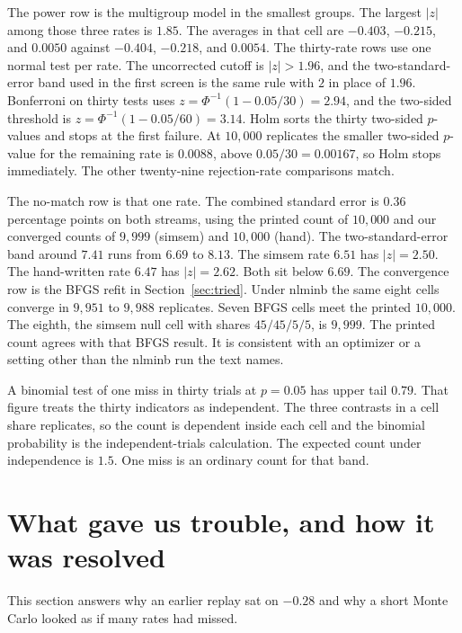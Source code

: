 \documentclass[11pt]{article}
\begin{document}
The power row is the multigroup model in the smallest groups. The
largest \(|z|\) among those three rates is \(1.85\). The averages in
that cell are \(-0.403\), \(-0.215\), and \(0.0050\) against
\(-0.404\), \(-0.218\), and \(0.0054\). The thirty-rate rows use one
normal test per rate. The uncorrected cutoff is \(|z|>1.96\), and the
two-standard-error band used in the first screen is the same rule with
\(2\) in place of \(1.96\). Bonferroni on thirty tests uses
\(z=\Phi^{-1}(1-0.05/30)=2.94\), and the two-sided threshold is
\(z=\Phi^{-1}(1-0.05/60)=3.14\). Holm sorts the thirty two-sided
\(p\)-values and stops at the first failure. At \(10{,}000\) replicates the smaller two-sided \(p\)-value for the
remaining rate is \(0.0088\), above \(0.05/30=0.00167\), so Holm stops
immediately. The other twenty-nine rejection-rate comparisons match.

The no-match row is that one rate. The combined standard error is
\(0.36\) percentage points on both streams, using the printed count of
\(10{,}000\) and our converged counts of \(9{,}999\) (simsem) and
\(10{,}000\) (hand). The two-standard-error band around \(7.41\) runs
from \(6.69\) to \(8.13\). The simsem rate \(6.51\) has \(|z|=2.50\).
The hand-written rate \(6.47\) has \(|z|=2.62\). Both sit below \(6.69\).
The convergence row is the BFGS refit in Section~\ref{sec:tried}.
Under nlminb the same eight cells converge in \(9{,}951\) to
\(9{,}988\) replicates. Seven BFGS cells meet the printed
\(10{,}000\). The eighth, the simsem null cell with shares
\(45/45/5/5\), is \(9{,}999\). The printed count agrees with that BFGS
result. It is consistent with an optimizer or a setting other than the
nlminb run the text names.

A binomial test of one miss in thirty trials at \(p=0.05\) has upper
tail \(0.79\). That figure treats the thirty indicators as independent.
The three contrasts in a cell share replicates, so the count is
dependent inside each cell and the binomial probability is the
independent-trials calculation. The expected count under independence
is \(1.5\). One miss is an ordinary count for that band.

\section{What gave us trouble, and how it was resolved}
\label{sec:trouble}

This section answers why an earlier replay sat on \(-0.28\) and why a
short Monte Carlo looked as if many rates had missed.
\end{document}
